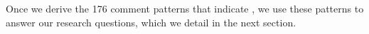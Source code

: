 Once we derive the 176 comment patterns that indicate \SADTD, we use these patterns to answer our research questions, which we detail in the next section.


%




